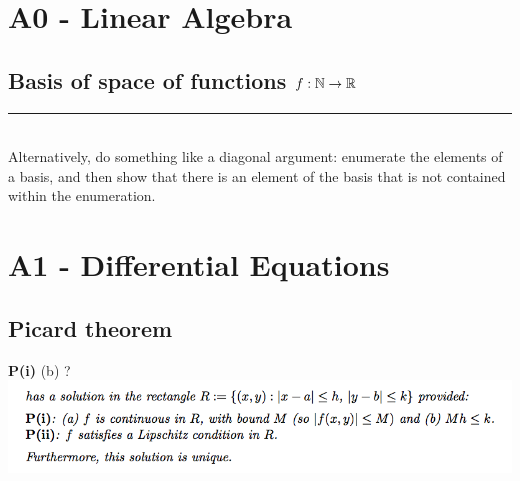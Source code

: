 \documentclass[12pt]{article}
\begin{document}
\section{A0 - Linear Algebra}
\subsection{Basis of space of functions $f:\mathbb{N} \to \mathbb{R}$}

\hrule
~\\
Alternatively, do something like a diagonal argument: enumerate the elements of
a basis, and then show that there is an element of the basis that is not
contained within the enumeration.


\section{A1 - Differential Equations}
\subsection{Picard theorem}
\textbf{P(i)} (b) ?\\
\includegraphics[width=400pt]{img/question-differential-equations-a1-picard.png}\\
\end{document}
